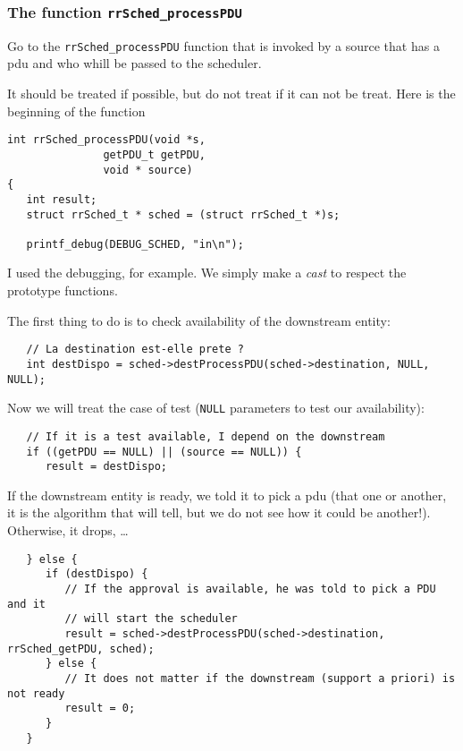 %
\subsubsection{The function {\tt rrSched\_processPDU}}

   Go to the {\tt rrSched\_processPDU} function
that is invoked by a source that has a {\sc pdu} and who whill be
passed to the scheduler.

    It should be treated if possible, but do not treat if
it can not be treat. Here is the beginning of the function

\begin{verbatim}
int rrSched_processPDU(void *s,
		       getPDU_t getPDU,
		       void * source)
{
   int result;
   struct rrSched_t * sched = (struct rrSched_t *)s;

   printf_debug(DEBUG_SCHED, "in\n");
\end{verbatim}

    I used the debugging, for example. We simply make a {\em cast}
to respect the prototype functions.

    The first thing to do is to check availability of the
downstream entity:

\begin{verbatim}
   // La destination est-elle prete ?
   int destDispo = sched->destProcessPDU(sched->destination, NULL, NULL);
\end{verbatim}
  
   Now we will treat the case of test ({\tt NULL} parameters  to test our availability):

\begin{verbatim}
   // If it is a test available, I depend on the downstream
   if ((getPDU == NULL) || (source == NULL)) {
      result = destDispo;
\end{verbatim}

  If the downstream entity is ready, we told it to pick a {\sc pdu} (that one or another, it is the algorithm that will tell, but we do not see how it could
be another!). Otherwise, it drops, \ldots

\begin{verbatim}
   } else {
      if (destDispo) {
         // If the approval is available, he was told to pick a PDU and it
         // will start the scheduler
         result = sched->destProcessPDU(sched->destination, rrSched_getPDU, sched);
      } else {
         // It does not matter if the downstream (support a priori) is not ready
         result = 0;
      }
   }
\end{verbatim}

